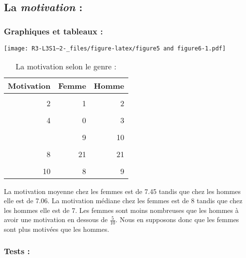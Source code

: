 \documentclass[
  11pt,
  french,
]{article}
\begin{document}
\hypertarget{la-motivation}{%
\subsection{\texorpdfstring{La \emph{motivation}
:}{La motivation :}}\label{la-motivation}}

\hypertarget{graphiques-et-tableaux}{%
\subsubsection{Graphiques et tableaux :}\label{graphiques-et-tableaux}}

\texttt{[image: R3-L3S1--2-\_files/figure-latex/figure5 and figure6-1.pdf]}

\begin{table}[!h]

\caption{\label{tab:table5}La motivation selon le genre :}
\centering
\begin{tabular}[t]{rrr}
\toprule
Motivation & Femme & Homme\\
\midrule
\cellcolor{gray!6}{1} & \cellcolor{gray!6}{1} & \cellcolor{gray!6}{2}\\
2 & 1 & 2\\
\cellcolor{gray!6}{3} & \cellcolor{gray!6}{3} & \cellcolor{gray!6}{1}\\
4 & 0 & 3\\
\cellcolor{gray!6}{5} & \cellcolor{gray!6}{1} & \cellcolor{gray!6}{5}\\
\addlinespace
6 & 9 & 10\\
\cellcolor{gray!6}{7} & \cellcolor{gray!6}{12} & \cellcolor{gray!6}{22}\\
8 & 21 & 21\\
\cellcolor{gray!6}{9} & \cellcolor{gray!6}{9} & \cellcolor{gray!6}{6}\\
10 & 8 & 9\\
\bottomrule
\end{tabular}
\end{table}

La motivation moyenne chez les femmes est de 7.45 tandis que chez les
hommes elle est de 7.06. La motivation médiane chez les femmes est de 8
tandis que chez les hommes elle est de 7. Les femmes sont moins
nombreuses que les hommes à avoir une motivation en dessous de
\(\frac{5}{10}\). Nous en supposons donc que les femmes sont plus
motivées que les hommes.

\hypertarget{tests}{%
\subsubsection{Tests :}\label{tests}}
\end{document}

